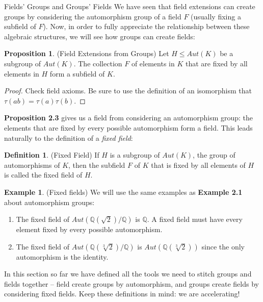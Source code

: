 \documentclass[12pt]{article}
\theoremstyle{definition}
\newtheorem{definition}{Definition}[section]
\theoremstyle{definition}
\newtheorem{example}{Example}[section]
\theoremstyle{definition}
\theoremstyle{definition}
\theoremstyle{definition}
\newtheorem{proposition}{Proposition}[section]
\theoremstyle{definition}
\begin{document}
\begin{section}{Fields' Groups and Groups' Fields}
    We have seen that field extensions can create groups by considering the automorphism group of a field \(F\) (usually fixing a subfield of \(F\)). Now, in order to fully appreciate the relationship between these 
    algebraic structures, we will see how groups can create fields:

    \begin{proposition}{(Field Extensions from Groups)}
        Let \(H \leq Aut(K)\) be a subgroup of \(Aut(K)\). The collection \(F\) of elements in \(K\) that are fixed by all elements in \(H\) form a subfield of \(K\).
        \begin{proof}
            Check field axioms. Be sure to use the definition of an isomorphism that \(\tau(ab) = \tau(a)\tau(b)\).
        \end{proof}
    \end{proposition}

    \textbf{Proposition 2.3} gives us a field from considering an automorphism group: the elements that are fixed by every possible automorphism form a field. This leads naturally to the definition of a 
    \textit{fixed field}:

    \begin{definition}{(Fixed Field)}
        If \(H\) is a subgroup of \(Aut(K)\), the group of automorphisms of \(K\), then the subfield \(F\) of \(K\) that is fixed by all elements of \(H\) is called the fixed field of \(H\).
    \end{definition}

    \begin{example}{(Fixed fields)}
        We will use the same examples as \textbf{Example 2.1} about automorphism groups:
        \begin{enumerate}
            \item The fixed field of \(Aut(\mathbb{Q}(\sqrt{2})/\mathbb{Q})\) is \(\mathbb{Q}\). A fixed field must have every element fixed by 
            every possible automorphism.
            \item The fixed field of \(Aut(\mathbb{Q}(\sqrt[3]{2})/\mathbb{Q})\) is \(Aut(\mathbb{Q}(\sqrt[3]{2}))\) since the only automorphism is the identity.
        \end{enumerate}
    \end{example}

    In this section so far we have defined all the tools we need to stitch groups and fields together -- field create groups by automorphism, and groups create fields by 
    considering fixed fields. Keep these definitions in mind: we are accelerating!
\end{section}
\end{document}
